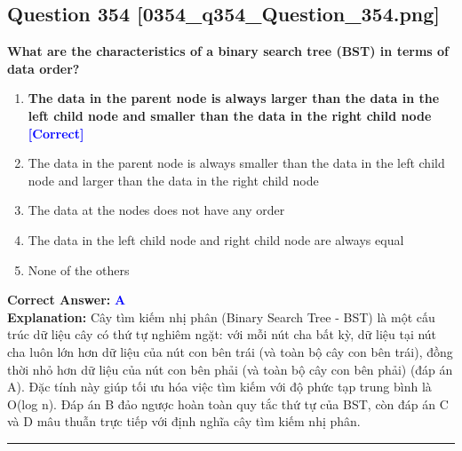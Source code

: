 \documentclass[11pt,a4paper]{article}
\begin{document}
\begin{minipage}{\textwidth}
\subsection*{Question 354 \quad \footnotesize{[0354\_q354\_Question\_354.png]}}
\noindent \textbf{What are the characteristics of a binary search tree (BST) in terms of data order?}

\begin{enumerate}[label=\Alph*.]
    \item \textbf{The data in the parent node is always larger than the data in the left child node and smaller than the data in the right child node} \hfill \textcolor{blue}{\textbf{[Correct]}}
    \item The data in the parent node is always smaller than the data in the left child node and larger than the data in the right child node
    \item The data at the nodes does not have any order
    \item The data in the left child node and right child node are always equal
    \item None of the others
\end{enumerate}

\noindent \textbf{Correct Answer:} \textcolor{blue}{\textbf{A}} \\[2pt]
\noindent \textbf{Explanation:} Cây tìm kiếm nhị phân (Binary Search Tree - BST) là một cấu trúc dữ liệu cây có thứ tự nghiêm ngặt: với mỗi nút cha bất kỳ, dữ liệu tại nút cha luôn lớn hơn dữ liệu của nút con bên trái (và toàn bộ cây con bên trái), đồng thời nhỏ hơn dữ liệu của nút con bên phải (và toàn bộ cây con bên phải) (đáp án A). Đặc tính này giúp tối ưu hóa việc tìm kiếm với độ phức tạp trung bình là O(log n). Đáp án B đảo ngược hoàn toàn quy tắc thứ tự của BST, còn đáp án C và D mâu thuẫn trực tiếp với định nghĩa cây tìm kiếm nhị phân.

\par\vspace{0.3cm}
\hrule
\vspace{0.3cm}
\end{minipage}
\end{document}
